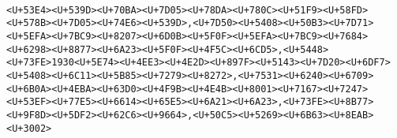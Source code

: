 \documentclass[
]{article}
\begin{document}
\begin{verbatim}
                                                                                                                                                                                                                                                                                                                                                                                                                                                                                                                                                                                                                                                                                                                                                                                                                                                                     <U+53E4><U+539D><U+70BA><U+7D05><U+78DA><U+780C><U+51F9><U+58FD><U+578B><U+7D05><U+74E6><U+539D>,<U+7D50><U+5408><U+50B3><U+7D71><U+5EFA><U+7BC9><U+8207><U+6D0B><U+5F0F><U+5EFA><U+7BC9><U+7684><U+6298><U+8877><U+6A23><U+5F0F><U+4F5C><U+6CD5>,<U+5448><U+73FE>1930<U+5E74><U+4EE3><U+4E2D><U+897F><U+5143><U+7D20><U+6DF7><U+5408><U+6C11><U+5B85><U+7279><U+8272>,<U+7531><U+6240><U+6709><U+6B0A><U+4EBA><U+63D0><U+4F9B><U+4E4B><U+8001><U+7167><U+7247><U+53EF><U+77E5><U+6614><U+65E5><U+6A21><U+6A23>,<U+73FE><U+8B77><U+9F8D><U+5DF2><U+62C6><U+9664>,<U+50C5><U+5269><U+6B63><U+8EAB><U+3002>

\end{verbatim}
\end{document}
